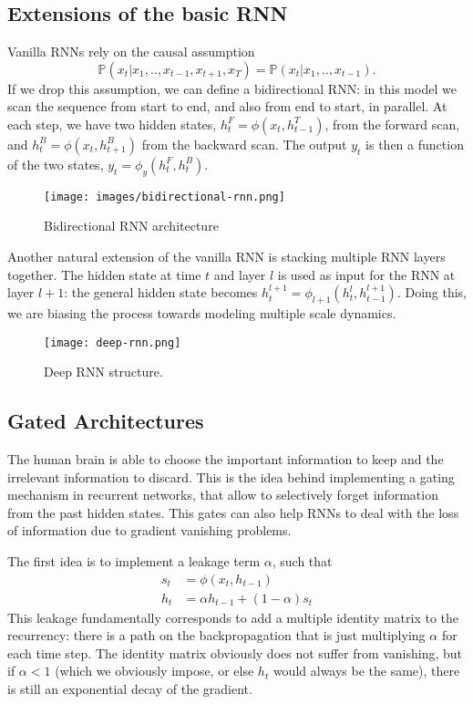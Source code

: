 \documentclass[oneside]{book}
\newcommand{\pr}{\mathbb{P}}
\theoremstyle{definition}
\theoremstyle{plain}
\begin{document}
\subsection{Extensions of the basic RNN}
Vanilla RNNs rely on the causal assumption 
\[\pr(x_{t}|x_1,..,x_{t-1},x_{t+1},x_T) = \pr(x_t|x_1,..,x_{t-1}).\]
If we drop this assumption, we can define a bidirectional RNN: in this model we scan the sequence from  start to  end, and also from end to start, in parallel. At each step, we have two hidden states, $h^F_t=\phi(x_t, h^{T}_{t-1})$, from the forward scan, and $h^B_t=\phi(x_t, h^B_{t+1})$ from the backward scan. The output $y_t$ is then a function of the two states, $y_t=\phi_y(h^F_t, h^B_t)$.
\begin{figure}
    \centering
    \texttt{[image: images/bidirectional-rnn.png]}
    \caption{Bidirectional RNN architecture}
    \label{fig:bidir-rnn}
\end{figure}

Another natural extension of the vanilla RNN is stacking multiple RNN layers together. The hidden state at time $t$ and layer $l$ is used as input for the RNN at layer $l+1$: the general hidden state becomes 
$h_{t}^{l+1} =\phi_{l+1}(h_t^l, h_{t-1}^{l+1})$.
Doing this, we are biasing the process towards modeling multiple scale dynamics. 
\begin{figure}
    \centering
    \texttt{[image: deep-rnn.png]}
    \caption{Deep RNN structure. }
    \label{fig:enter-label}
\end{figure}
\subsection{Gated Architectures}

The human brain is able to choose the important information to keep and the irrelevant information to discard. This is the idea behind implementing a gating mechanism in recurrent networks, that allow to selectively forget information from the past hidden states.
This gates can also help RNNs to deal with the loss of information due to gradient vanishing problems. 

The first idea is to implement a leakage term $\alpha$, such that
\begin{align*}
    s_t&= \phi(x_t,h_{t-1})\\
    h_{t}&=\alpha h_{t-1} + (1-\alpha)s_t
\end{align*}
This leakage fundamentally corresponds to add a multiple identity matrix to the recurrency: there is a path on the backpropagation that is just multiplying $\alpha$ for each time step.
The identity matrix obviously does not suffer from vanishing, but if $\alpha<1$ (which we obviously impose, or else $h_t$ would always be the same), there is still an exponential decay of the gradient.
\end{document}
